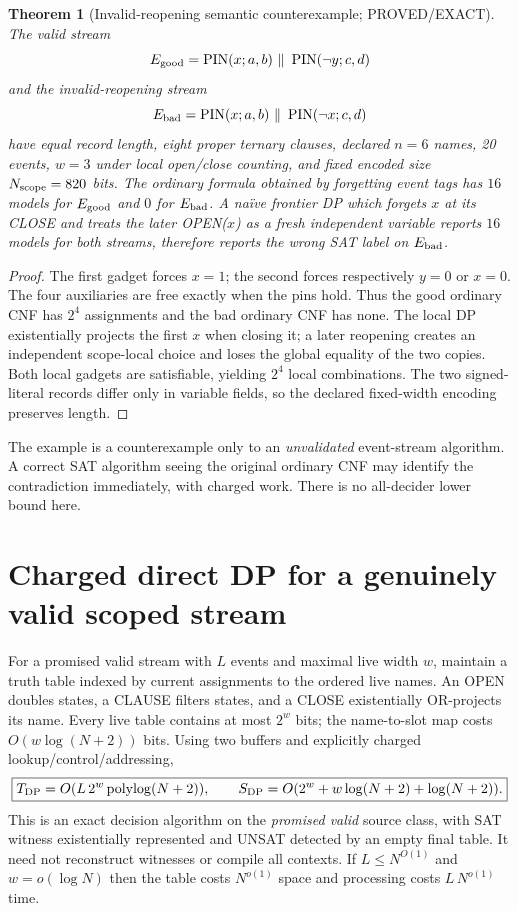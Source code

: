 \documentclass[11pt]{article}
\newtheorem{theorem}{Theorem}
\begin{document}
\begin{theorem}[Invalid-reopening semantic counterexample; PROVED/EXACT]
The valid stream
\[
E_{\rm good}=\operatorname{PIN}(x;a,b)
\ \Vert\ \operatorname{PIN}(\neg y;c,d)
\]
and the invalid-reopening stream
\[
E_{\rm bad}=\operatorname{PIN}(x;a,b)
\ \Vert\ \operatorname{PIN}(\neg x;c,d)
\]
have equal record length, eight proper ternary clauses, declared
$n=6$ names, 20 events, $w=3$ under local open/close counting,
and fixed encoded size $N_{\rm scope}=820$ bits.
The ordinary formula obtained by forgetting event tags has
$16$ models for $E_{\rm good}$ and $0$ for $E_{\rm bad}$.
A naïve frontier DP which forgets $x$ at its CLOSE and treats the later
OPEN($x$) as a fresh independent variable reports $16$ models for
\emph{both} streams, therefore reports the wrong SAT label on
$E_{\rm bad}$.
\end{theorem}
\begin{proof}
The first gadget forces $x=1$; the second forces respectively
$y=0$ or $x=0$. The four auxiliaries are free exactly when the pins
hold. Thus the good ordinary CNF has $2^4$ assignments and the bad
ordinary CNF has none. The local DP existentially projects the first
$x$ when closing it; a later reopening creates an independent
scope-local choice and loses the global equality of the two copies.
Both local gadgets are satisfiable, yielding $2^4$ local combinations.
The two signed-literal records differ only in variable fields, so
the declared fixed-width encoding preserves length.
\end{proof}
The example is a counterexample only to an \emph{unvalidated}
event-stream algorithm. A correct SAT algorithm seeing the original
ordinary CNF may identify the contradiction immediately, with
charged work. There is no all-decider lower bound here.

\section{Charged direct DP for a genuinely valid scoped stream}
For a promised valid stream with $L$ events and maximal live width $w$,
maintain a truth table indexed by current assignments to the ordered
live names. An OPEN doubles states, a CLAUSE filters states, and a
CLOSE existentially OR-projects its name. Every live table contains at
most $2^w$ bits; the name-to-slot map costs $O(w\log(N+2))$ bits.
Using two buffers and explicitly charged lookup/control/addressing,
\[
\boxed{
T_{\rm DP}=O(L\,2^w\operatorname{polylog}(N+2)),\qquad
S_{\rm DP}=O(2^w+w\log(N+2)+\log(N+2)).
}
\]
This is an exact decision algorithm on the \emph{promised valid}
source class, with SAT witness existentially represented and UNSAT
detected by an empty final table. It need not reconstruct witnesses
or compile all contexts. If $L\le N^{O(1)}$ and $w=o(\log N)$ then
the table costs $N^{o(1)}$ space and processing costs
$L\,N^{o(1)}$ time.
\end{document}
